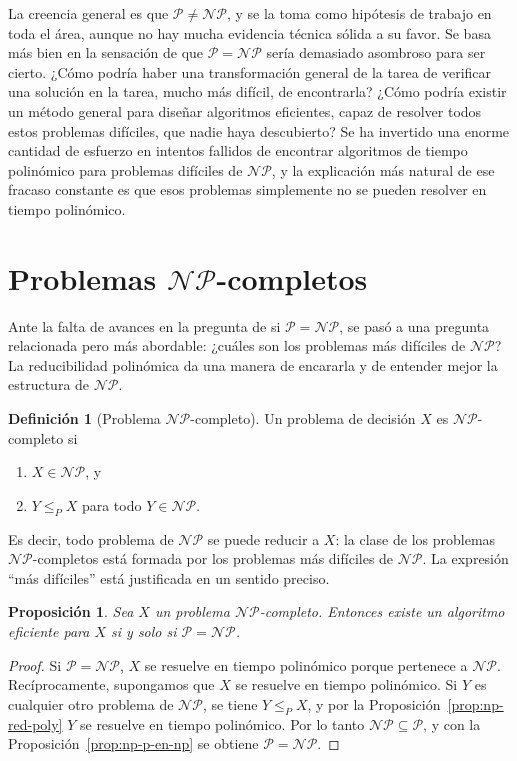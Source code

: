 \documentclass[12pt, spanish, oneside, openany]{book}
\newcommand{\clP}{\mathcal{P}}
\newcommand{\NP}{\mathcal{NP}}
\newcommand{\redp}{\le_{P}}
\theoremstyle{uprightplain}
\newtheorem{proposicion}[teorema]{Proposición}
\theoremstyle{definition}
\newtheorem{definicion}[teorema]{Definición}
\theoremstyle{remark}
\theoremstyle{definition}
\begin{document}
La creencia general es que $\clP\neq\NP$, y se la toma como hipótesis de trabajo en toda el área, aunque no hay mucha evidencia técnica sólida a su favor. Se basa más bien en la sensación de que $\clP=\NP$ sería demasiado asombroso para ser cierto. ¿Cómo podría haber una transformación general de la tarea de verificar una solución en la tarea, mucho más difícil, de encontrarla? ¿Cómo podría existir un método general para diseñar algoritmos eficientes, capaz de resolver todos estos problemas difíciles, que nadie haya descubierto? Se ha invertido una enorme cantidad de esfuerzo en intentos fallidos de encontrar algoritmos de tiempo polinómico para problemas difíciles de $\NP$, y la explicación más natural de ese fracaso constante es que esos problemas simplemente no se pueden resolver en tiempo polinómico.


\section{\texorpdfstring{Problemas $\NP$-completos}{Problemas NP-completos}}
\label{sec:np-completos}

Ante la falta de avances en la pregunta de si $\clP=\NP$, se pasó a una pregunta relacionada pero más abordable: ¿cuáles son los problemas más difíciles de $\NP$? La reducibilidad polinómica da una manera de encararla y de entender mejor la estructura de $\NP$.

\begin{definicion}[Problema $\NP$-completo]
\label{def:np-completo}
Un problema de decisión $X$ es $\NP$-completo si
\begin{enumerate}[label=(\roman*)]
    \item $X\in\NP$, y
    \item $Y\redp X$ para todo $Y\in\NP$.
\end{enumerate}
\end{definicion}

Es decir, todo problema de $\NP$ se puede reducir a $X$: la clase de los problemas $\NP$-completos está formada por los problemas más difíciles de $\NP$. La expresión ``más difíciles'' está justificada en un sentido preciso.

\begin{proposicion}
\label{prop:np-completo-p}
Sea $X$ un problema $\NP$-completo. Entonces existe un algoritmo eficiente para $X$ si y solo si $\clP=\NP$.
\end{proposicion}
\begin{proof}
Si $\clP=\NP$, $X$ se resuelve en tiempo polinómico porque pertenece a $\NP$. Recíprocamente, supongamos que $X$ se resuelve en tiempo polinómico. Si $Y$ es cualquier otro problema de $\NP$, se tiene $Y\redp X$, y por la Proposición~\ref{prop:np-red-poly} $Y$ se resuelve en tiempo polinómico. Por lo tanto $\NP\subseteq\clP$, y con la Proposición~\ref{prop:np-p-en-np} se obtiene $\clP=\NP$.
\end{proof}
\end{document}
